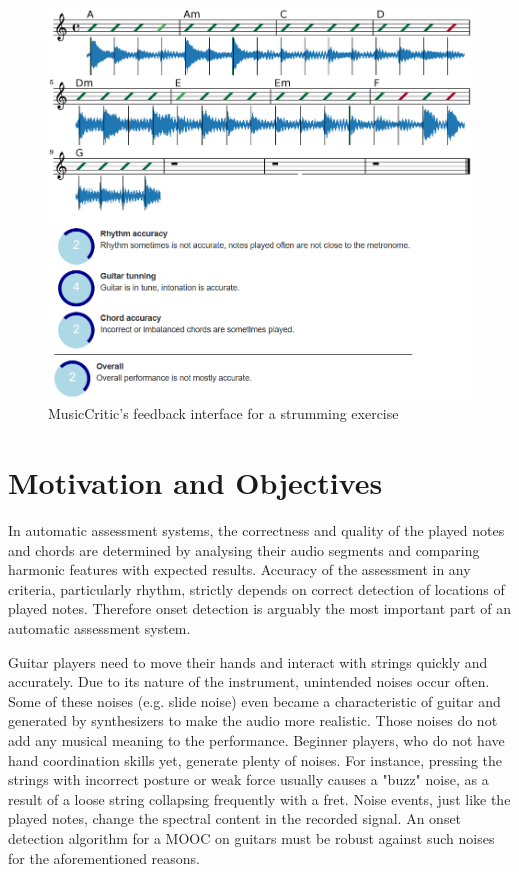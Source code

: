 \begin{figure}
    \centering
    \includegraphics[width=\columnwidth]{introduction/mciritic.png}
    \caption{MusicCritic's feedback interface for a strumming exercise}
    \label{fig:musiccritic}
\end{figure}

\section{Motivation and Objectives}

In automatic assessment systems, the correctness and quality of the played notes and chords are determined by analysing their audio segments and comparing harmonic features with expected results. Accuracy of the assessment in any criteria, particularly rhythm, strictly depends on correct detection of locations of played notes. Therefore onset detection is arguably the most important part of an automatic assessment system.

Guitar players need to move their hands and interact with strings quickly and accurately. Due to its nature of the instrument, unintended noises occur often. Some of these noises (e.g. slide noise) even became a characteristic of guitar and generated by synthesizers to make the audio more realistic. Those noises do not add any musical meaning to the performance. Beginner players, who do not have hand coordination skills yet, generate plenty of noises. For instance, pressing the strings with incorrect posture or weak force usually causes a "buzz" noise, as a result of a loose string collapsing frequently with a fret. Noise events, just like the played notes, change the spectral content in the recorded signal. An onset detection algorithm for a MOOC on guitars must be robust against such noises for the aforementioned reasons. 

